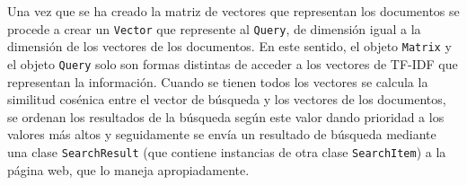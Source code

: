 \begin{frame}[fragile]
Una vez que se ha creado la matriz de vectores que representan 
los documentos se procede a crear un \texttt{Vector} que represente al 
\texttt{Query}, de dimensión igual a la dimensión de los vectores de los documentos.
En este sentido, el objeto \texttt{Matrix} y el objeto \texttt{Query} solo son
formas distintas de acceder a los vectores de TF-IDF que 
representan la información.
\pause \newline
Cuando se tienen todos los vectores se calcula la similitud 
cosénica entre el vector de búsqueda y los vectores de los documentos, se ordenan los resultados de la búsqueda según este valor dando prioridad a
los valores más altos y seguidamente se envía un resultado de búsqueda mediante una clase \texttt{SearchResult} (que contiene instancias de
otra clase \texttt{SearchItem}) a la página web, que lo maneja apropiadamente.
\end{frame}





